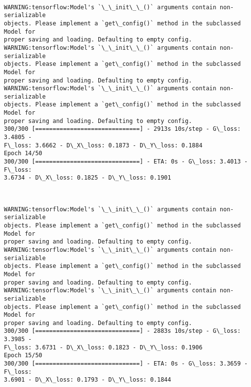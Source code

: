 \documentclass[11pt]{article}
\begin{document}
    \begin{center}
    \end{center}
    { \hspace*{\fill} \\}
    
    \begin{Verbatim}[commandchars=\\\{\}]
WARNING:tensorflow:Model's `\_\_init\_\_()` arguments contain non-serializable
objects. Please implement a `get\_config()` method in the subclassed Model for
proper saving and loading. Defaulting to empty config.
WARNING:tensorflow:Model's `\_\_init\_\_()` arguments contain non-serializable
objects. Please implement a `get\_config()` method in the subclassed Model for
proper saving and loading. Defaulting to empty config.
WARNING:tensorflow:Model's `\_\_init\_\_()` arguments contain non-serializable
objects. Please implement a `get\_config()` method in the subclassed Model for
proper saving and loading. Defaulting to empty config.
300/300 [==============================] - 2913s 10s/step - G\_loss: 3.4805 -
F\_loss: 3.6662 - D\_X\_loss: 0.1873 - D\_Y\_loss: 0.1884
Epoch 14/50
300/300 [==============================] - ETA: 0s - G\_loss: 3.4013 - F\_loss:
3.6734 - D\_X\_loss: 0.1825 - D\_Y\_loss: 0.1901
    \end{Verbatim}

    \begin{center}
    \end{center}
    { \hspace*{\fill} \\}
    
    \begin{Verbatim}[commandchars=\\\{\}]
WARNING:tensorflow:Model's `\_\_init\_\_()` arguments contain non-serializable
objects. Please implement a `get\_config()` method in the subclassed Model for
proper saving and loading. Defaulting to empty config.
WARNING:tensorflow:Model's `\_\_init\_\_()` arguments contain non-serializable
objects. Please implement a `get\_config()` method in the subclassed Model for
proper saving and loading. Defaulting to empty config.
WARNING:tensorflow:Model's `\_\_init\_\_()` arguments contain non-serializable
objects. Please implement a `get\_config()` method in the subclassed Model for
proper saving and loading. Defaulting to empty config.
300/300 [==============================] - 2883s 10s/step - G\_loss: 3.3985 -
F\_loss: 3.6731 - D\_X\_loss: 0.1823 - D\_Y\_loss: 0.1906
Epoch 15/50
300/300 [==============================] - ETA: 0s - G\_loss: 3.3659 - F\_loss:
3.6901 - D\_X\_loss: 0.1793 - D\_Y\_loss: 0.1844
    \end{Verbatim}
\end{document}
